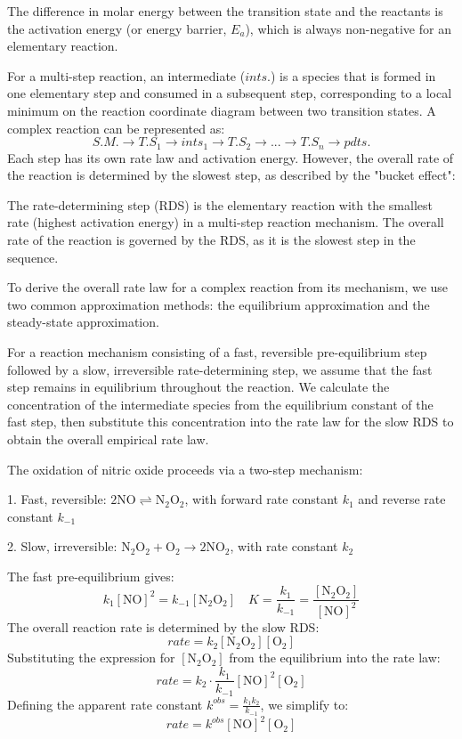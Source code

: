The difference in molar energy between the transition state and the reactants is the activation energy (or energy barrier, $E_a$), which is always non-negative for an elementary reaction.

For a multi-step reaction, an intermediate ($ints.$) is a species that is formed in one elementary step and consumed in a subsequent step, corresponding to a local minimum on the reaction coordinate diagram between two transition states. A complex reaction can be represented as:
$$S.M.\longrightarrow T.S_1 \longrightarrow ints_1\longrightarrow T.S_2\longrightarrow...\longrightarrow T.S_n \longrightarrow pdts.$$
Each step has its own rate law and activation energy. However, the overall rate of the reaction is determined by the slowest step, as described by the "bucket effect":

\begin{definition}
The rate-determining step (RDS) is the elementary reaction with the smallest rate (highest activation energy) in a multi-step reaction mechanism. The overall rate of the reaction is governed by the RDS, as it is the slowest step in the sequence.
\end{definition}

To derive the overall rate law for a complex reaction from its mechanism, we use two common approximation methods: the equilibrium approximation and the steady-state approximation.

\begin{proposition}
For a reaction mechanism consisting of a fast, reversible pre-equilibrium step followed by a slow, irreversible rate-determining step, we assume that the fast step remains in equilibrium throughout the reaction. We calculate the concentration of the intermediate species from the equilibrium constant of the fast step, then substitute this concentration into the rate law for the slow RDS to obtain the overall empirical rate law.
\end{proposition}

\begin{example}
The oxidation of nitric oxide proceeds via a two-step mechanism:

1. Fast, reversible: $2\text{NO} \rightleftharpoons  \text{N}_2\text{O}_2$, with forward rate constant $k_{1}$ and reverse rate constant $k_{-1}$

2. Slow, irreversible: $\text{N}_2\text{O}_2 + \text{O}_2 \longrightarrow 2\text{NO}_2$, with rate constant $k_2$

The fast pre-equilibrium gives:
$$k_1[\text{NO}]^2 = k_{-1}[\text{N}_2\text{O}_2] \quad K = \frac{k_1}{k_{-1}} = \frac{[\text{N}_2\text{O}_2]}{[\text{NO}]^2}$$
The overall reaction rate is determined by the slow RDS:
$$rate = k_2 [\text{N}_2\text{O}_2][\text{O}_2]$$
Substituting the expression for $[\text{N}_2\text{O}_2]$ from the equilibrium into the rate law:
$$rate = k_2 \cdot \frac{k_1}{k_{-1}} [\text{NO}]^2 [\text{O}_2]$$
Defining the apparent rate constant $k^{obs} = \frac{k_1 k_2}{k_{-1}}$, we simplify to:
$$rate = k^{obs} [\text{NO}]^2 [\text{O}_2]$$
\end{example}

